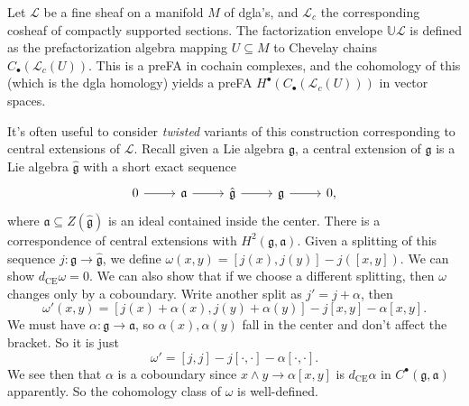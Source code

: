 
Let $\mathcal{L} $ be a fine sheaf on a manifold $M$ of dgla's, and $\mathcal{L} _c$ the corresponding cosheaf of compactly supported sections. The factorization envelope $\mathbb{U} \mathcal{L} $ is defined as the prefactorization algebra mapping $U\subseteq M$ to Chevelay chains $C_{\bullet} (\mathcal{L} _c(U))$. This is a preFA in cochain complexes, and the cohomology of this (which is the dgla homology) yields a preFA $H^{\bullet} (C_{\bullet} (\mathcal{L} _c(U)))$ in vector spaces.

It's often useful to consider \emph{twisted} variants of this construction corresponding to central extensions of $\mathcal{L} $. Recall given a Lie algebra $\mathfrak{g}$, a central extension of $\mathfrak{g} $ is a Lie algebra $\hat{\mathfrak{g} }$ with a short exact sequence
\[\begin{tikzcd}[row sep = 2.5em, column sep = 2.5em]
	0\ar[r]  & \mathfrak{a} \ar[r]  & \hat{\mathfrak{g} }\ar[r]  & \mathfrak{g} \ar[r]  & 0,
\end{tikzcd}\]
where $\mathfrak{a} \subseteq Z(\hat{\mathfrak{g} })$ is an ideal contained inside the center. There is a correspondence of central extensions with $H^2(\mathfrak{g} ,\mathfrak{a} )$. Given a splitting of this sequence $j : \mathfrak{g}  \to \hat{\mathfrak{g} }$, we define $\omega (x,y)=[j(x),j(y)]-j([x,y])$. We can show $d_{\mathrm{CE} } \omega =0$. We can also show that if we choose a different splitting, then $\omega $ changes only by a coboundary. Write another split as $j'=j+\alpha $, then
\[
	\omega '(x,y)=[j(x)+\alpha (x),j(y)+\alpha (y)]-j[x,y]-\alpha [x,y]
.\]
We must have $\alpha : \mathfrak{g}  \to \mathfrak{a} $, so $\alpha (x),\alpha (y)$ fall in the center and don't affect the bracket. So it is just
\[
	\omega '=[j,j]-j[\cdot ,\cdot ]-\alpha [\cdot ,\cdot ]
.\]
We see then that $\alpha $ is a coboundary since $x\wedge y\to \alpha [x,y]$ is $d_{\mathrm{CE} } \alpha $ in $C^{\bullet} (\mathfrak{g} ,\mathfrak{a} )$ apparently. So the cohomology class of $\omega $ is well-defined.

